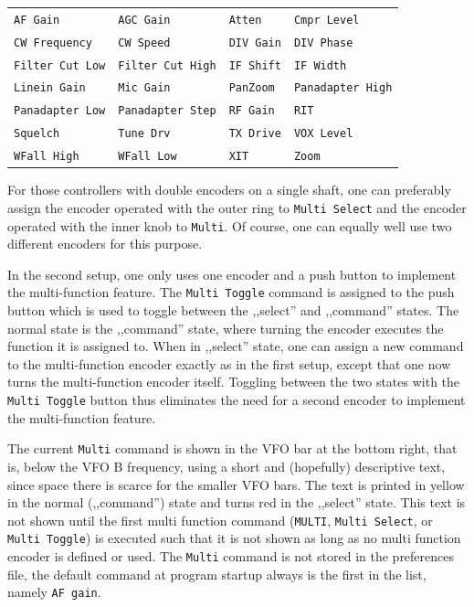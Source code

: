 \documentclass[12pt]{book}
\def\bltt#1{\texttt{\color{blue}#1}}
\begin{document}
\begin{center}
\begin{tabular}{llll}
\bltt{AF Gain}         & \bltt{AGC Gain} & \bltt{Atten}       & \bltt{Cmpr Level}     \\
\bltt{CW Frequency} & \bltt{CW Speed}        & \bltt{DIV Gain} & \bltt{DIV Phase}  \\
\bltt{Filter Cut Low} & \bltt{Filter Cut High} & \bltt{IF Shift}        & \bltt{IF Width} \\
\bltt{Linein Gain} & \bltt{Mic Gain}       & \bltt{PanZoom} & \bltt{Panadapter High} \\
\bltt{Panadapter Low} & \bltt{Panadapter Step} & \bltt{RF Gain} & \bltt{RIT} \\
\bltt{Squelch} & \bltt{Tune Drv} & \bltt{TX Drive} & \bltt{VOX Level}  \\
\bltt{WFall High} & \bltt{WFall Low} & \bltt{XIT} & \bltt{Zoom}
\end{tabular}
\end{center}

For those controllers with double encoders on a single shaft, one can preferably assign the encoder
operated with the outer ring  to \bltt{Multi Select} and the encoder operated with the inner
knob to \bltt{Multi}. Of course, one can equally well use two different encoders for this purpose.

In the second setup, one only uses one encoder and a push button to implement the multi-function
feature. The \bltt{Multi Toggle} command is assigned to the push button which is used to toggle
between the ,,select'' and ,,command'' states. The normal state is the ,,command'' state, where
turning the encoder executes the function it is assigned to. When in ,,select'' state, one can
assign a new command to the multi-function encoder exactly as in the first setup, except that
one now turns the multi-function encoder itself. Toggling between the
two states with the \bltt{Multi Toggle} button
thus eliminates the need for a second encoder to implement the multi-function feature.

The current \bltt{Multi} command is shown in the VFO bar at the bottom right, that is, below
the VFO B frequency, using a short and (hopefully) descriptive text, since space there is
scarce for the smaller VFO bars. The text is printed in yellow in the normal (,,command'') state and
turns red in the ,,select'' state. This text is not shown until the first multi function command
(\bltt{MULTI}, \bltt{Multi Select}, or \bltt{Multi Toggle}) is executed such that it is not
shown as long as no multi function encoder is defined or used. The \bltt{Multi} command is not
stored in the preferences file, the default command at program startup always is the first in the list,
namely \bltt{AF gain}.
\end{document}
